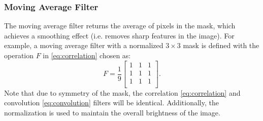 \subsubsection{Moving Average Filter}
The moving average filter returns the average of pixels in the mask, which achieves a smoothing effect (i.e. removes sharp features in the image). For example, a moving average filter with a normalized $3 \times 3$ mask is defined with the operation $F$ in \eqref{eq:correlation} chosen as:
\begin{equation*}
    F = \frac{1}{9}\begin{bmatrix}
    1 & 1 & 1 \\
    1 & 1 & 1 \\
    1 & 1 & 1 \\
    \end{bmatrix}.
\end{equation*}
Note that due to symmetry of the mask, the correlation \eqref{eq:correlation} and convolution \eqref{eq:convolution} filters will be identical. Additionally, the normalization is used to maintain the overall brightness of the image.

